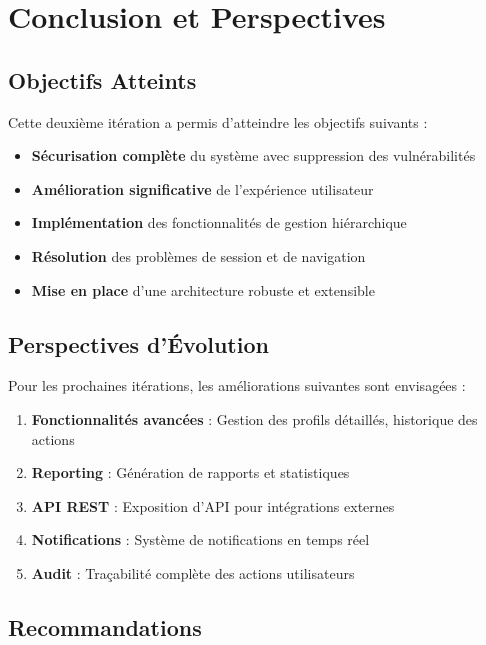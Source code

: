 \documentclass[12pt,a4paper]{article}
\begin{document}
\section{Conclusion et Perspectives}

\subsection{Objectifs Atteints}

Cette deuxième itération a permis d'atteindre les objectifs suivants :

\begin{itemize}
    \item \textbf{Sécurisation complète} du système avec suppression des vulnérabilités
    \item \textbf{Amélioration significative} de l'expérience utilisateur
    \item \textbf{Implémentation} des fonctionnalités de gestion hiérarchique
    \item \textbf{Résolution} des problèmes de session et de navigation
    \item \textbf{Mise en place} d'une architecture robuste et extensible
\end{itemize}

\subsection{Perspectives d'Évolution}

Pour les prochaines itérations, les améliorations suivantes sont envisagées :

\begin{enumerate}
    \item \textbf{Fonctionnalités avancées} : Gestion des profils détaillés, historique des actions
    \item \textbf{Reporting} : Génération de rapports et statistiques
    \item \textbf{API REST} : Exposition d'API pour intégrations externes
    \item \textbf{Notifications} : Système de notifications en temps réel
    \item \textbf{Audit} : Traçabilité complète des actions utilisateurs
\end{enumerate}

\subsection{Recommandations}
\end{document}
